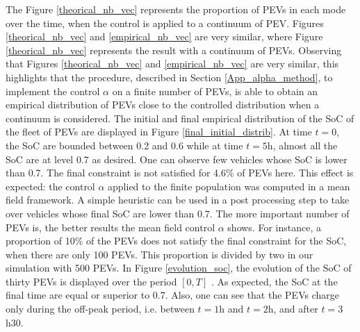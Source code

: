 \documentclass[conference]{IEEEtran}
\begin{document}
The Figure \ref{theorical_nb_vec} represents the proportion of PEVs in each mode over the time, when the control is applied to a continuum of PEV.
Figures \ref{theorical_nb_vec} and \ref{empirical_nb_vec} are very similar, where Figure \ref{theorical_nb_vec} represents the result with a continuum of PEVs.
Observing that Figures \ref{theorical_nb_vec} and \ref{empirical_nb_vec} are very similar, this highlights that the procedure, described in Section \ref{App_alpha_method}, to implement the control $\alpha$ on a finite number of PEVs, is able to obtain an empirical distribution of PEVs close to the controlled distribution when a continuum is considered. 
The initial and final empirical distribution of the SoC of the fleet of PEVs are displayed in Figure \ref{final_initial_distrib}. At time $t=0$, the SoC are bounded between 0.2 and 0.6 while at time $t=5$h, almost all the SoC are at level 0.7 as desired. One can observe few vehicles whose SoC is lower than 0.7. The final constraint is not satisfied for 4.6\%  of PEVs here. This effect is expected: the control  $\alpha$ applied to the finite population was computed in a mean field framework. A simple heuristic can be used in a post processing step to take over vehicles whose final SoC are lower than 0.7. The more important number of PEVs is, the better results the mean field control $\alpha$ shows. For instance, a proportion of 10\% of the PEVs does not satisfy the final constraint for the SoC, when there are only 100 PEVs. This proportion is divided by two in our simulation with 500 PEVs.
In Figure \ref{evolution_soc}, the evolution of the SoC of thirty PEVs is displayed over the period $[0,T]$ . As expected, the SoC at the final time are equal or superior to 0.7. Also, one can see that the PEVs charge only during the off-peak period, i.e. between $t = 1$h and $t = 2$h, and after $t = 3$h30. 
\end{document}
